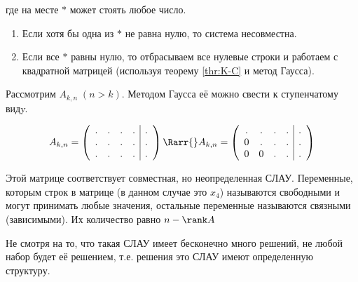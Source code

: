 где на месте \(*\) может стоять любое число.

\begin{enumerate}
\item
  Если хотя бы одна из \(*\) не равна нулю, то система несовместна.
  
\item
  Если все \(*\) равны нулю, то отбрасываем все нулевые строки и работаем с
  квадратной матрицей (используя теорему \ref{thr:K-C} и метод Гаусса).
\end{enumerate}

Рассмотрим  \(A_{k, n}\; (n > k)\).  Методом
Гаусса её можно свести к ступенчатому видy.

\begin{equation*}
  A_{k, n} = \left( \begin{array}{cccc|c}
    . & . & . & . & . \\
    . & . & . & . & . \\
    . & . & . & . & .
  \end{array} \right)
    \Rarr{}
  A_{k, n} = \left( \begin{array}{cccc|c}
    . & . & . & . & . \\
    0 & . & . & . & . \\
    0 & 0 & . & . & .
  \end{array} \right)
\end{equation*}

Этой матрице соответствует совместная, но неопределенная СЛАУ. Переменные,
которым  строк в матрице (в данном случае это \(x_4\))
называются свободными и могут принимать любые значения, остальные переменные
называются связными (зависимыми). Их количество равно \(n - \rank A\)

\begin{remark}
  Не смотря на то, что такая СЛАУ имеет бесконечно много решений, не любой набор
  будет её решением, т.е. решения это СЛАУ имеют определенную структуру.
\end{remark}
